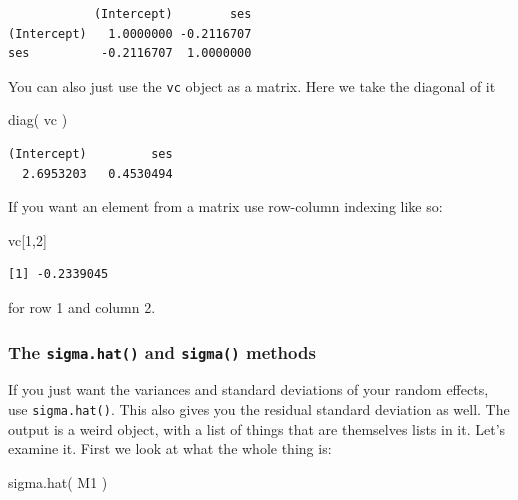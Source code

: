\documentclass[
  letterpaper,
  DIV=11,
  numbers=noendperiod]{scrreprt}
\newenvironment{Shaded}{\begin{snugshade}}{\end{snugshade}}
\newcommand{\DecValTok}[1]{\textcolor[rgb]{0.25,0.63,0.44}{#1}}
\newcommand{\FunctionTok}[1]{\textcolor[rgb]{0.02,0.16,0.49}{#1}}
\newcommand{\NormalTok}[1]{\textcolor[rgb]{0.00,0.44,0.13}{#1}}
\begin{document}
\begin{verbatim}
            (Intercept)        ses
(Intercept)   1.0000000 -0.2116707
ses          -0.2116707  1.0000000
\end{verbatim}

You can also just use the \texttt{vc} object as a matrix. Here we take
the diagonal of it

\begin{Shaded}
\begin{Highlighting}[]
\FunctionTok{diag}\NormalTok{( vc )}
\end{Highlighting}
\end{Shaded}

\begin{verbatim}
(Intercept)         ses 
  2.6953203   0.4530494 
\end{verbatim}

If you want an element from a matrix use row-column indexing like so:

\begin{Shaded}
\begin{Highlighting}[]
\NormalTok{vc[}\DecValTok{1}\NormalTok{,}\DecValTok{2}\NormalTok{]}
\end{Highlighting}
\end{Shaded}

\begin{verbatim}
[1] -0.2339045
\end{verbatim}

for row 1 and column 2.

\hypertarget{the-sigma.hat-and-sigma-methods}{%
\subsubsection{\texorpdfstring{The \texttt{sigma.hat()} and
\texttt{sigma()}
methods}{The sigma.hat() and sigma() methods}}\label{the-sigma.hat-and-sigma-methods}}

If you just want the variances and standard deviations of your random
effects, use \texttt{sigma.hat()}. This also gives you the residual
standard deviation as well. The output is a weird object, with a list of
things that are themselves lists in it. Let's examine it. First we look
at what the whole thing is:

\begin{Shaded}
\begin{Highlighting}[]
\FunctionTok{sigma.hat}\NormalTok{( M1 )}
\end{Highlighting}
\end{Shaded}
\end{document}
